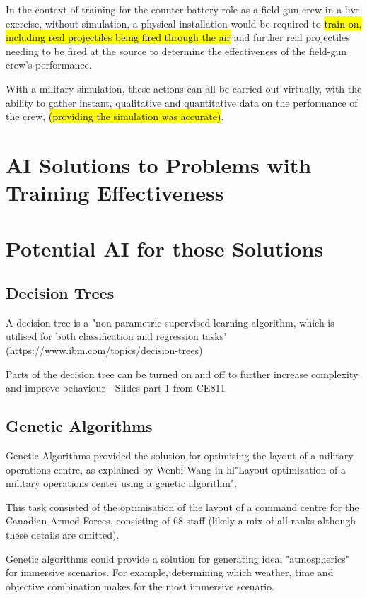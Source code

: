 \documentclass{article}
\begin{document}
In the context of training for the counter-battery role as a field-gun crew in a live exercise, without simulation, a physical installation would be required to \hl{train on, including real projectiles being fired through the air} and further real projectiles needing to be fired at the source to determine the effectiveness of the field-gun crew's performance.

With a military simulation, these actions can all be carried out virtually, with the ability to gather instant, qualitative and quantitative data on the performance of the crew, \hl{(providing the simulation was accurate)}.

\section{AI Solutions to Problems with Training Effectiveness}

\section{Potential AI for those Solutions}

\subsection{Decision Trees}

A decision tree is a "non-parametric supervised learning algorithm, which is utilised for both classification and regression tasks" (https://www.ibm.com/topics/decision-trees)

Parts of the decision tree can be turned on and off to further increase complexity and improve behaviour - Slides part 1 from CE811

\subsection{Genetic Algorithms}

Genetic Algorithms provided the solution for optimising the layout of a military operations centre, as explained by Wenbi Wang in hl{"Layout optimization of a military operations center using a genetic algorithm".}

This task consisted of the optimisation of the layout of a command centre for the Canadian Armed Forces, consisting of 68 staff (likely a mix of all ranks although these details are omitted).

Genetic algorithms could provide a solution for generating ideal "atmospherics" for immersive scenarios. For example, determining which weather, time and objective combination makes for the most immersive scenario.  
\end{document}
